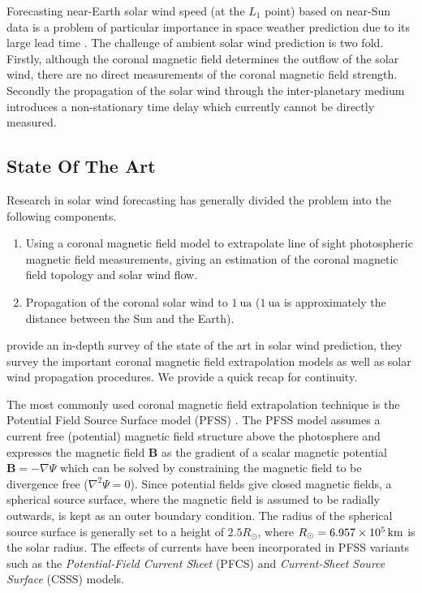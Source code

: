 Forecasting near-Earth solar wind speed (at the $L_1$ point) based on near-Sun data is a problem of 
particular importance in space weather prediction due to its large lead time 
\citep{doi:10.1002/jgra.50429,doi:10.1029/2009SW000542}. The challenge of ambient solar wind 
prediction is two fold. Firstly, although the coronal magnetic field determines the outflow of the 
solar wind, there are no direct measurements of the coronal magnetic field strength. Secondly the 
propagation of the solar wind through the inter-planetary medium introduces a non-stationary time 
delay which currently cannot be directly measured. 

\subsection{State Of The Art}\label{sec:solarwindsota}
Research in solar wind forecasting has generally divided the problem into the following components.
%
\begin{enumerate} 
  \item Using a coronal magnetic field model to extrapolate line of sight photospheric magnetic 
        field measurements, giving an estimation of the coronal magnetic field topology and 
        solar wind flow.
  \item Propagation of the coronal solar wind to $\SI{1}{\astronomicalunit}$ 
        ($\SI{1}{\astronomicalunit}$ is approximately the distance between the Sun and the Earth).
\end{enumerate} 
%
\citet{Reiss_2019} provide an in-depth survey of the state of the art in solar wind prediction, 
they survey the important coronal magnetic field extrapolation models as well as solar wind 
propagation procedures. We provide a quick recap for continuity.

The most commonly used coronal magnetic field extrapolation technique is the Potential Field Source 
Surface model (PFSS) \citep{altschuler1969magnetic,schatten1969model}. The PFSS model assumes a 
current free (potential) magnetic field structure above the photosphere and expresses the magnetic 
field $\mathbf{B}$ as the gradient of a scalar magnetic potential $\mathbf{B} = -\nabla \Psi$ which 
can be solved by constraining the magnetic field to be divergence free ($\nabla^{2}\Psi = 0$). 
Since potential fields give closed magnetic fields, a spherical source surface, where the magnetic 
field is assumed to be radially outwards, is kept as an outer boundary condition. The radius of the 
spherical source surface is generally set to a height of 
$2.5 R_{\odot}$, where $R_{\odot} = \SI{6.957d5}{\kilo\metre}$ is the solar radius. The effects of 
currents have been incorporated in PFSS variants such as the \emph{Potential-Field Current Sheet} 
(PFCS) \citep{schatten1971current} and \emph{Current-Sheet Source Surface} (CSSS) \citep{csss} 
models. 

